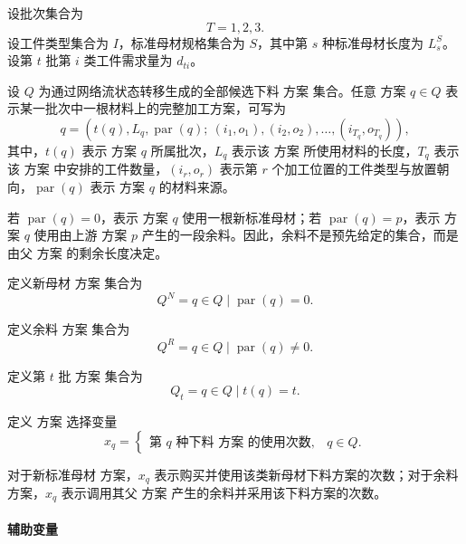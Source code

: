 \documentclass[UTF8]{ctexart}
\begin{document}
设批次集合为
\begin{equation}
T={1,2,3}.
\end{equation}
设工件类型集合为 $I$，标准母材规格集合为 $S$，其中第 $s$ 种标准母材长度为 $L_s^S$。设第 $t$ 批第 $i$ 类工件需求量为 $d_{ti}$。

设 $Q$ 为通过网络流状态转移生成的全部候选下料 方案 集合。任意 方案 $q\in Q$ 表示某一批次中一根材料上的完整加工方案，可写为
\begin{equation}
q=\left(t(q),L_q,\operatorname{par}(q);\ (i_1,o_1),(i_2,o_2),\ldots,(i_{T_q},o_{T_q})\right),
\end{equation}
其中，$t(q)$ 表示 方案 $q$ 所属批次，$L_q$ 表示该 方案 所使用材料的长度，$T_q$ 表示该 方案 中安排的工件数量，$(i_r,o_r)$ 表示第 $r$ 个加工位置的工件类型与放置朝向，$\operatorname{par}(q)$ 表示 方案 $q$ 的材料来源。

若 $\operatorname{par}(q)=0$，表示 方案 $q$ 使用一根新标准母材；若 $\operatorname{par}(q)=p$，表示 方案 $q$ 使用由上游 方案 $p$ 产生的一段余料。因此，余料不是预先给定的集合，而是由父 方案 的剩余长度决定。

定义新母材 方案 集合为
\begin{equation}
Q^N={q\in Q\mid \operatorname{par}(q)=0}.
\end{equation}

定义余料 方案 集合为
\begin{equation}
Q^R={q\in Q\mid \operatorname{par}(q)\neq 0}.
\end{equation}

定义第 $t$ 批 方案 集合为
\begin{equation}
Q_t={q\in Q\mid t(q)=t}.
\end{equation}

定义 方案 选择变量
\begin{equation}
x_q=
\begin{cases}
\text{第 }q\text{ 种下料 方案 的使用次数}, & q\in Q.
\end{cases}
\end{equation}

对于新标准母材 方案，$x_q$ 表示购买并使用该类新母材下料方案的次数；对于余料 方案，$x_q$ 表示调用其父 方案 产生的余料并采用该下料方案的次数。

\paragraph{辅助变量}
\end{document}
